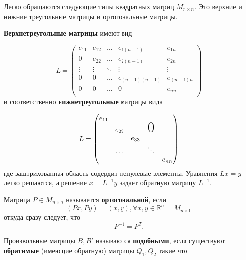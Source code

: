 Легко обращаются следующие типы квадратных матриц $M_{n \times n}$. Это верхние и нижние треугольные матрицы и ортогональные матрицы.

\textbf{Верхнетреугольные матрицы} имеют вид

\begin{equation} \label{eq:6.8}
	L = \begin{pmatrix}
		e_{11} & e_{12} & \dots &e_{1(n-1)}&e_{1n} \\
		0 & e_{22} & \dots &e_{2(n-1)}&e_{2n} \\
		\vdots & \vdots & \ddots &\vdots &  \vdots\\
		0 & 0 & \dots & e_{(n-1)(n-1)} &e_{(n-1)n} \\
		0 & 0 & \dots & 0 &e_{nn} \\
	\end{pmatrix}
\end{equation}
и соответственно \textbf{нижнетреугольные} матрицы вида 

\begin{equation} \label{eq:6.9}
	L = \begin{pmatrix}
		e_{11}	&		&		&	&        \\
		&e_{22}	&   		& \text{\huge0} &\\
		&		&e_{33} &	&            \\
		&\dots & & \ddots &          \\
		& 		&   		&   & e_{nn} 
	\end{pmatrix}
\end{equation}
где заштрихованная область содердит ненулевые элементы. Уравнения $Lx = y$ легко решаются, а решение $x = L^{-1}y$ задает обратную матрицу $L^{-1}$.


Матрица $P \in M_{n \times n}$ называется \textbf{ортогональной}, если
\begin{equation} \label{eq:6.10}
	(Px, Py) = (x, y), \forall x, y \in \mathbb{R}^n = M_{n \times 1}
\end{equation}
откуда сразу следует, что
\begin{equation} \label{eq:6.11}
	P^{-1} = P^T .
\end{equation}

Произвольные матрицы $B, B'$ называются \textbf{подобными}, если существуют \textbf{обратимые} (имеющие обратную) матрицы $Q_1, Q_2$ такие что

